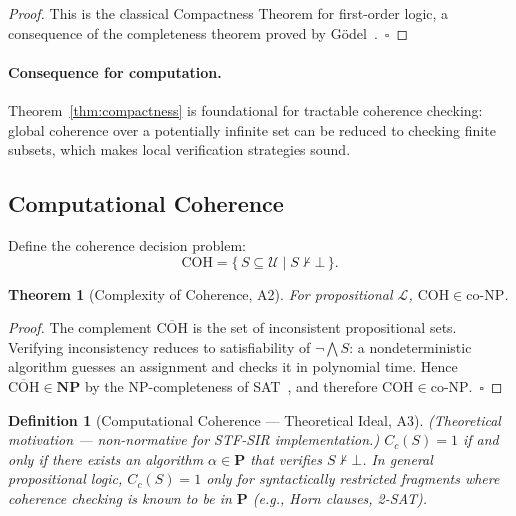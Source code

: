 \documentclass{article}
\newcommand{\Univ}{\mathcal{U}}
\newtheorem{theorem}{Theorem}
\newtheorem{definition}{Definition}
\begin{document}
\begin{proof}
This is the classical Compactness Theorem for first-order logic, a consequence
of the completeness theorem proved by G\"{o}del~\cite{godel1930}.~$\square$
\end{proof}

\paragraph{Consequence for computation.}
Theorem~\ref{thm:compactness} is foundational for tractable coherence checking:
global coherence over a potentially infinite set can be reduced to checking
finite subsets, which makes local verification strategies sound.

\subsection{Computational Coherence}
\label{app:comp-coh}

Define the coherence decision problem:
\[
  \mathrm{COH} = \bigl\{\, S \subseteq \Univ \mid S \nvdash \bot \,\bigr\}.
\]

\begin{theorem}[Complexity of Coherence, A2]
\label{thm:coh-conp}
For propositional $\mathcal{L}$, $\mathrm{COH} \in \mathrm{co\text{-}NP}$.
\end{theorem}

\begin{proof}
The complement $\overline{\mathrm{COH}}$ is the set of inconsistent
propositional sets.  Verifying inconsistency reduces to satisfiability of
$\neg\bigwedge S$: a nondeterministic algorithm guesses an assignment and
checks it in polynomial time.  Hence $\overline{\mathrm{COH}} \in \mathbf{NP}$
by the NP-completeness of SAT~\cite{cook1971}, and therefore
$\mathrm{COH} \in \mathrm{co\text{-}NP}$.~$\square$
\end{proof}

\begin{definition}[Computational Coherence — Theoretical Ideal, A3]
\label{def:compcoh}
\emph{(Theoretical motivation — non-normative for STF-SIR implementation.)}
$C_c(S) = 1$ if and only if there exists an algorithm $\alpha \in \mathbf{P}$
that verifies $S \nvdash \bot$.  In general propositional logic,
$C_c(S) = 1$ only for syntactically restricted fragments where coherence
checking is known to be in $\mathbf{P}$ (e.g., Horn clauses, 2-SAT).
\end{definition}
\end{document}
